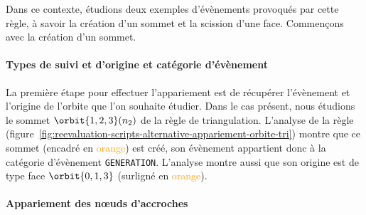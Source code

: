 Dans ce contexte, étudions deux exemples d'évènements provoqués par cette règle,
à savoir la création d'un sommet et la scission d'une face. %
Commençons avec la création d'un sommet. %

\paragraph{Types de suivi et d'origine et catégorie d'évènement}


La première étape pour effectuer l'appariement est de récupérer l'évènement et
l'origine de l'orbite que l'on souhaite étudier. %
Dans le cas présent, nous étudions le sommet \(\orbit{1,2,3}(n_{2})\) de la
règle de triangulation. %
L'analyse de la règle
(figure~\ref{fig:reevaluation-scripts-alternative-appariement-orbite-tri})
montre que ce sommet (encadré en \textcolor{orange}{orange}) est créé, son
évènement appartient donc à la catégorie d'évènement \texttt{GENERATION}. %
L'analyse montre aussi que son origine est de type face \(\orbit{0,1,3}\)
(surligné en \textcolor{orange}{orange}). %


\paragraph{Appariement des n\oe uds d'accroches}


